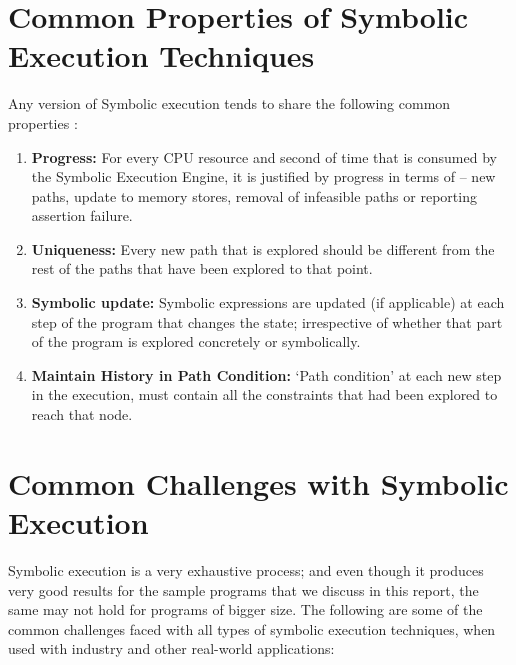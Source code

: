 \documentclass[11pt]{llncs}
\begin{document}
\section{Common Properties of Symbolic Execution Techniques }
	Any version of Symbolic execution tends to share the following common properties \cite{2_Survey_SE}:
	\begin{enumerate}
		\item \textbf{Progress:} For every CPU resource and second of time that is consumed by the Symbolic Execution Engine, it is justified by progress in terms of – new paths, update to memory stores, removal of infeasible paths or reporting assertion failure. \cite{2_Survey_SE}

		\vspace{2mm}

		\item \textbf{Uniqueness:} Every new path that is explored should be different from the rest of the paths that have been explored to that point.

		\vspace{2mm}

		\item \textbf{Symbolic update:}  Symbolic expressions are updated (if applicable) at each step of the program that changes the state; irrespective of whether that part of the program is explored concretely or symbolically.

		\vspace{2mm}

		\item \textbf{Maintain History in Path Condition:} ‘Path condition’ at each new step in the execution, must contain all the constraints that had been explored to reach that node.
	\end{enumerate}



\section{Common Challenges with Symbolic Execution}
	Symbolic execution is a very exhaustive process; and even though it produces very good results for the sample programs that we discuss in this report, the same may not hold for programs of bigger size. The following are some of the common challenges faced with all types of symbolic execution techniques, when used with industry and other real-world applications:

    \vspace{-1mm}
    
\end{document}
